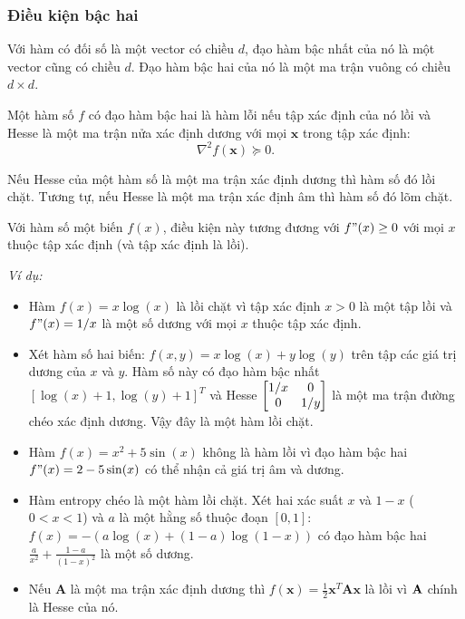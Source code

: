 \subsubsection{Điều kiện bậc hai}
Với hàm có đối số là một vector có chiều $d$, đạo hàm bậc
nhất của nó là một vector cũng có chiều $d$. Đạo hàm bậc hai của nó là một ma
trận vuông có chiều $d\times d$.

 {Một hàm số $f$ có đạo hàm bậc hai là hàm lỗi nếu tập xác định của nó lồi và Hesse là một ma trận {nửa xác định dương} với mọi $\mathbf{x}$ trong tập xác định:
\begin{equation*}
\nabla^2 f(\mathbf{x}) \succeq 0.
\end{equation*}
}


Nếu Hesse của một hàm số là một ma trận {xác định dương} thì hàm số đó
lồi chặt. Tương tự, nếu Hesse là một ma trận {xác
định âm} thì hàm số đó lõm chặt.

Với hàm số một biến $f(x)$, điều kiện này tương đương với $f"(x) \geq 0$ với mọi
$x$ thuộc tập xác định (và tập xác định là lồi).

{}
\textit{Ví dụ:}
\begin{itemize}
\item Hàm $f(x) = x\log(x)$ là lồi chặt vì tập xác định $x > 0$ là một tập lồi và $f"(x) = 1/x$ là một số
dương với mọi $x$ thuộc tập xác định.
\item Xét hàm số hai biến: $f(x, y) = x
\log(x) + y \log(y) $ trên tập các giá trị dương của $x$ và $y$. Hàm số này
có đạo hàm bậc nhất $[\log(x) + 1, \log(y) + 1]^T$ và Hesse $\left[\begin{matrix}
1/x & 0 \\ 0 & 1/y
\end{matrix}\right] $ là một ma trận đường chéo xác định dương. Vậy đây là một hàm lồi chặt.

\item Hàm $f(x) = x^2 + 5\sin(x)$ không là hàm lồi vì đạo hàm bậc hai $f"(x)
= 2 - 5\sin(x)$ có thể nhận cả giá trị âm và dương.

\item Hàm {entropy} chéo là một hàm lồi chặt. Xét hai xác suất $x$ và $1 - x$ ($0 < x < 1$) và $a$ là một hằng số thuộc
đoạn $[0, 1]$: $f(x) = -(a \log(x) + (1 - a) \log(1 - x))$ có
đạo hàm bậc hai $\frac{a}{x^2} + \frac{1 - a}{(1-x)^2}$ là một số dương.

\item Nếu $\mathbf{A}$ là một ma trận xác định dương thì $f(\mathbf{x}) =
\frac{1}{2}\mathbf{x}^T\mathbf{Ax}$ là lồi vì $\mathbf{A}$ chính là Hesse của nó.



\end{itemize}



